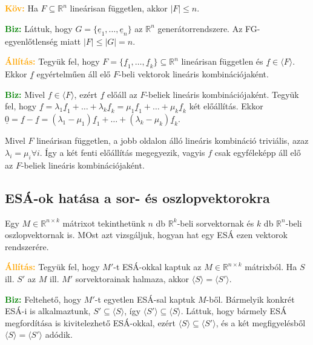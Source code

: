 \documentclass[../szamtud.tex]{subfiles}
\begin{document}
        \textcolor{orange}{\textbf{Köv:}} Ha $F \subseteq \mathbb{R}^n$ lineárisan független, akkor $|F| \leq n$.

        \textcolor{green}{\textbf{Biz:}} Láttuk, hogy $G = \{\underline{e}_1, \dots, \underline{e}_n\}$ az $\mathbb{R}^n$ generátorrendszere. Az FG-egyenlőtlenség miatt $|F| \leq |G| = n$.

        \textcolor{orange}{\textbf{Állítás:}} Tegyük fel, hogy $F = \{\underline{f}_1, \dots, \underline{f}_k\} \subseteq \mathbb{R}^n$ lineárisan független és $\underline{f} \in \langle F \rangle$. Ekkor $\underline{f}$ egyértelműen áll elő $F$-beli vektorok lineáris kombinációjaként.

        \textcolor{green}{\textbf{Biz:}} Mivel $f \in \langle F \rangle$, ezért $\underline{f}$ előáll az $F$-beliek lineáris kombinációjaként. Tegyük fel, hogy $\underline{f} = \lambda_1 \underline{f}_1 + \dots + \lambda_k \underline{f}_k = \mu_1 \underline{f}_1 + \dots + \mu_k \underline{f}_k$ két előállítás. Ekkor $\underline{0} = \underline{f} - \underline{f} = (\lambda_1 - \mu_1)\underline{f}_1 + \dots + (\lambda_k - \mu_k) \underline{f}_k$.

        Mivel $F$ lineárisan független, a jobb oldalon álló lineáris kombináció triviális, azaz $\lambda_i = \mu_i \forall i$. Így a két fenti előállítás megegyezik, vagyis $f$ csak egyféleképp áll elő az $F$-beliek lineáris kombinációjaként.

    \subsection{ESÁ-ok hatása a sor- és oszlopvektorokra}

        Egy $M \in \mathbb{R}^{n \times k}$ mátrixot tekinthetünk $n$ db $\mathbb{R}^k$-beli sorvektornak és $k$ db $\mathbb{R}^n$-beli oszlopvektornak is. MOst azt vizsgáljuk, hogyan hat egy ESÁ ezen vektorok rendszerére.

        \textcolor{orange}{\textbf{Állítás:}} Tegyük fel, hogy $M'$-t ESÁ-okkal kaptuk az $M \in \mathbb{R}^{n \times k}$ mátrixból. Ha $S$ ill. $S'$ az $M$ ill. $M'$ sorvektorainak halmaza, akkor $\langle S \rangle = \langle S' \rangle$. 

        \textcolor{green}{\textbf{Biz:}} Feltehető, hogy $M'$-t egyetlen ESÁ-sal kaptuk $M$-ből. Bármelyik konkrét ESÁ-i is alkalmaztunk, $S' \subseteq \langle S \rangle$, így $\langle S' \rangle \subseteq \langle S \rangle$. Láttuk, hogy bármely ESÁ megfordítása is kivitelezhető ESÁ-okkal, ezért $\langle S \rangle \subseteq \langle S' \rangle$, és a két megfigyelésből $\langle S \rangle = \langle S'\rangle$ adódik.
        
\end{document}
